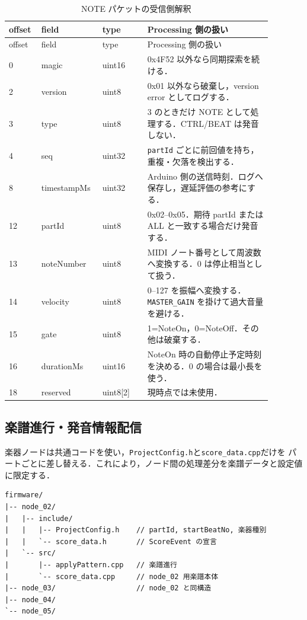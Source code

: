 \documentclass[lualatex,book,paper=a4paper,jafontsize=11.5pt,jafontscale=1.05]{jlreq}
\newcommand{\code}[1]{\texttt{#1}}
\begin{document}
\begin{longtable}{p{0.10\linewidth}p{0.18\linewidth}p{0.16\linewidth}p{0.44\linewidth}}
\caption{NOTE パケットの受信側解釈}\label{tab:note}\\
\toprule
offset & field & type & Processing 側の扱い \\
\midrule
\endfirsthead
\toprule
offset & field & type & Processing 側の扱い \\
\midrule
\endhead
0 & magic & uint16 & 0x4F52 以外なら同期探索を続ける． \\
2 & version & uint8 & 0x01 以外なら破棄し，version error としてログする． \\
3 & type & uint8 & 3 のときだけ NOTE として処理する．CTRL/BEAT は発音しない． \\
4 & seq & uint32 & \texttt{partId} ごとに前回値を持ち，重複・欠落を検出する． \\
8 & timestampMs & uint32 & Arduino 側の送信時刻．ログへ保存し，遅延評価の参考にする． \\
12 & partId & uint8 & 0x02--0x05．期待 partId または ALL と一致する場合だけ発音する． \\
13 & noteNumber & uint8 & MIDI ノート番号として周波数へ変換する．0 は停止相当として扱う． \\
14 & velocity & uint8 & 0--127 を振幅へ変換する．\texttt{MASTER\_GAIN} を掛けて過大音量を避ける． \\
15 & gate & uint8 & 1=NoteOn，0=NoteOff．その他は破棄する． \\
16 & durationMs & uint16 & NoteOn 時の自動停止予定時刻を決める．0 の場合は最小長を使う． \\
18 & reserved & uint8[2] & 現時点では未使用． \\
\bottomrule
\end{longtable}
\subsection{楽譜進行・発音情報配信}
楽器ノードは共通コードを使い，\code{ProjectConfig.h}と\code{score\_data.cpp}だけを
パートごとに差し替える．これにより，ノード間の処理差分を楽譜データと設定値に限定する．

\begin{verbatim}
firmware/
|-- node_02/
|   |-- include/
|   |   |-- ProjectConfig.h    // partId, startBeatNo, 楽器種別
|   |   `-- score_data.h       // ScoreEvent の宣言
|   `-- src/
|       |-- applyPattern.cpp   // 楽譜進行
|       `-- score_data.cpp     // node_02 用楽譜本体
|-- node_03/                   // node_02 と同構造
|-- node_04/
`-- node_05/
\end{verbatim}
\end{document}
